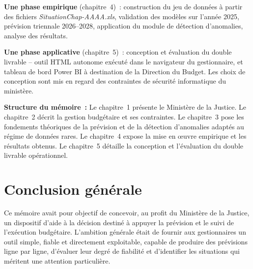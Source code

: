 \documentclass[12pt,a4paper]{article}
\begin{document}
\textbf{Une phase empirique} (chapitre~4)~: construction du jeu de donn\'ees \`a partir des fichiers \textit{SituationChap-AAAA.xls}, validation des mod\`eles sur l'ann\'ee 2025, pr\'evision triennale 2026--2028, application du module de d\'etection d'anomalies, analyse des r\'esultats.

\textbf{Une phase applicative} (chapitre~5)~: conception et \'evaluation du double livrable -- outil HTML autonome ex\'ecut\'e dans le navigateur du gestionnaire, et tableau de bord Power BI \`a destination de la Direction du Budget. Les choix de conception sont mis en regard des contraintes de s\'ecurit\'e informatique du minist\`ere.

\medskip

\textbf{Structure du m\'emoire~:} Le chapitre~1 pr\'esente le Minist\`ere de la Justice. Le chapitre~2 d\'ecrit la gestion budg\'etaire et ses contraintes. Le chapitre~3 pose les fondements th\'eoriques de la pr\'evision et de la d\'etection d'anomalies adapt\'es au r\'egime de donn\'ees rares. Le chapitre~4 expose la mise en \oe{}uvre empirique et les r\'esultats obtenus. Le chapitre~5 d\'etaille la conception et l'\'evaluation du double livrable op\'erationnel.

\newpage



\newpage


\newpage


\newpage


\newpage


\newpage

\section*{Conclusion g\'en\'erale}

Ce m\'emoire avait pour objectif de concevoir, au profit du Minist\`ere de
la Justice, un dispositif d'aide \`a la d\'ecision destin\'e \`a appuyer la
pr\'evision et le suivi de l'ex\'ecution budg\'etaire. L'ambition
g\'en\'erale \'etait de fournir aux gestionnaires un outil simple, fiable et
directement exploitable, capable de produire des pr\'evisions ligne par
ligne, d'\'evaluer leur degr\'e de fiabilit\'e et d'identifier les
situations qui m\'eritent une attention particuli\`ere.
\end{document}
